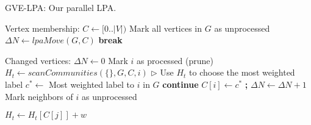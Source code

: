\begin{algorithm}[hbtp]
\caption{GVE-LPA: Our parallel LPA.}
\label{alg:rak}
\begin{algorithmic}[1]

\Statex

 \label{alg:rak--main-begin}
  \State Vertex membership: $C \gets [0 .. |V|)$ \label{alg:rak--init-begin}
  \State Mark all vertices in $G$ as unprocessed \label{alg:rak--init-end}
  \ForAll{$l_i \in [0 .. \text{\small{MAX\_ITERATIONS}})$} \label{alg:rak--iters-begin}
    \State $\Delta N \gets lpaMove(G, C)$ \label{alg:rak--propagate}
     \textbf{break}  \label{alg:rak--converged}
    \EndIf
  \EndFor \label{alg:rak--iters-end}
   \label{alg:rak--main-return}
\EndFunction \label{alg:rak--main-end}

\Statex

 \label{alg:rak--move-begin}
  \State Changed vertices: $\Delta N \gets 0$
    \State Mark $i$ as processed (prune) \label{alg:rak--prune}
    \State $H_t \gets scanCommunities(\{\}, G, C, i)$ \label{alg:rak--scan}
    \State $\rhd$ Use $H_t$ to choose the most weighted label
    \State $c^* \gets$ Most weighted label to $i$ in $G$ \label{alg:rak--best-community}
     \textbf{continue} \label{alg:rak--best-community-same}
    \EndIf
    \State $C[i] \gets c^*$ \textbf{;} $\Delta N \gets \Delta N + 1$ \label{alg:rak--perform-move}
    \State Mark neighbors of $i$ as unprocessed \label{alg:rak--remark}
  \EndFor
{} \label{alg:rak--move-return}
\EndFunction \label{alg:rak--move-end}

\Statex

 \label{alg:rak--scan-begin}
     $H_t \gets H_t[C[j]] + w$
    \EndIf
  \EndFor
\EndFunction \label{alg:rak--scan-end}
\end{algorithmic}
\end{algorithm}
